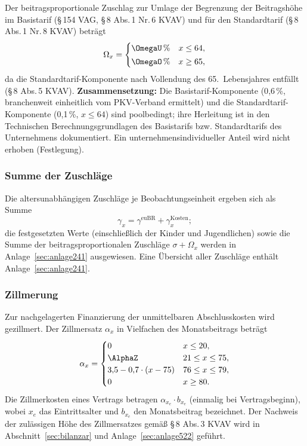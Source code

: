 Der beitragsproportionale Zuschlag zur Umlage der Begrenzung der
Beitragshöhe im Basistarif (\S\,154 VAG, \S\,8 Abs.\,1 Nr.\,6 KVAV)
und für den Standardtarif (\S\,8 Abs.\,1 Nr.\,8 KVAV) beträgt
\begin{equation}
\Omega_x = \begin{cases}
\OmegaU\,\% & x \le 64,\\[2pt]
\OmegaO\,\% & x \ge 65,
\end{cases}
\label{eq:omegaz}
\end{equation}
da die Standardtarif-Komponente nach Vollendung des 65.~Lebensjahres
entfällt (\S\,8 Abs.\,5 KVAV). \textbf{Zusammensetzung:} Die
Basistarif-Komponente (0{,}6\,\%, branchenweit einheitlich vom
PKV-Verband ermittelt) und die Standardtarif-Komponente (0{,}1\,\%,
$x \le 64$) sind poolbedingt; ihre Herleitung ist in den Technischen
Berechnungsgrundlagen des Basistarifs bzw. Standardtarifs des
Unternehmens dokumentiert. Ein unternehmensindividueller Anteil wird
nicht erhoben (Festlegung).

\subsubsection{Summe der Zuschläge}\label{sec:zuschlagsumme}

Die altersunabhängigen Zuschläge je Beobachtungseinheit ergeben sich
als Summe
\begin{equation}
\gamma_x = \gamma^{\mathrm{euBR}} + \gamma^{\mathrm{Kosten}}_x;
\label{eq:gammasumme}
\end{equation}
die festgesetzten Werte (einschließlich der Kinder und Jugendlichen)
sowie die Summe der beitragsproportionalen Zuschläge
$\sigma + \Omega_x$ werden in Anlage~\ref{sec:anlage241}
ausgewiesen. Eine Übersicht aller Zuschläge enthält Anlage~\ref{sec:anlage241}.

\subsubsection{Zillmerung}\label{sec:zillmerung}

Zur nachgelagerten Finanzierung der unmittelbaren Abschlusskosten wird
gezillmert. Der Zillmersatz $\alpha_x$ in Vielfachen des
Monatsbeitrags beträgt
\begin{equation}
\alpha_x = \begin{cases}
0 & x \le 20,\\
\AlphaZ & 21 \le x \le 75,\\
3{,}5 - 0{,}7\cdot(x-75) & 76 \le x \le 79,\\
0 & x \ge 80.
\end{cases}
\label{eq:zillmer}
\end{equation}
Die Zillmerkosten eines Vertrags betragen $\alpha_{x_e}\cdot b_{x_e}$
(einmalig bei Vertragsbeginn), wobei $x_e$ das Eintrittsalter und
$b_{x_e}$ den Monatsbeitrag bezeichnet. Der Nachweis der zulässigen
Höhe des Zillmersatzes gemäß \S\,8 Abs.\,3 KVAV wird in
Abschnitt~\ref{sec:bilanzar} und Anlage~\ref{sec:anlage522} geführt.
